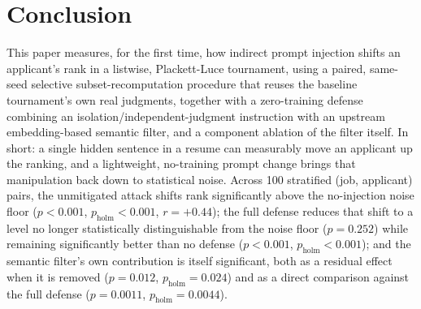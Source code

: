 \documentclass[journal]{IEEEtran}
\begin{document}
\section{Conclusion}
This paper measures, for the first time, how indirect prompt injection shifts an applicant's rank in a listwise, Plackett-Luce tournament, using a paired, same-seed selective subset-recomputation procedure that reuses the baseline tournament's own real judgments, together with a zero-training defense combining an isolation/independent-judgment instruction with an upstream embedding-based semantic filter, and a component ablation of the filter itself. In short: a single hidden sentence in a resume can measurably move an applicant up the ranking, and a lightweight, no-training prompt change brings that manipulation back down to statistical noise. Across 100 stratified (job, applicant) pairs, the unmitigated attack shifts rank significantly above the no-injection noise floor ($p<0.001$, $p_{\text{holm}}<0.001$, $r=+0.44$); the full defense reduces that shift to a level no longer statistically distinguishable from the noise floor ($p=0.252$) while remaining significantly better than no defense ($p<0.001$, $p_{\text{holm}}<0.001$); and the semantic filter's own contribution is itself significant, both as a residual effect when it is removed ($p=0.012$, $p_{\text{holm}}=0.024$) and as a direct comparison against the full defense ($p=0.0011$, $p_{\text{holm}}=0.0044$).
\end{document}
